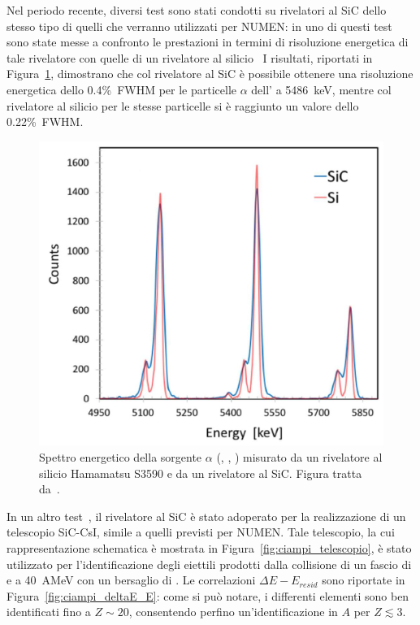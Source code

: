 Nel periodo recente, diversi test sono stati condotti su rivelatori al SiC dello stesso tipo di quelli che verranno utilizzati per NUMEN: in uno di questi test sono state messe a confronto le prestazioni in termini di risoluzione energetica di tale rivelatore con quelle di un rivelatore al silicio~\cite{tudisco:sensors18}
I risultati, riportati in Figura~\ref{fig:tudisco_spettro}, dimostrano che col rivelatore al SiC è possibile ottenere una risoluzione energetica dello 0.4\%~FWHM per le particelle $\alpha$ dell' a 5486~keV, mentre col rivelatore al silicio per le stesse particelle si è raggiunto un valore dello 0.22\%~FWHM.
\begin{figure} [!p]
	\centering
	\includegraphics[width=\textwidth, keepaspectratio]{Grafici/spettro_sic_tagliato.png}
	\caption{Spettro energetico della sorgente $\alpha$ (, , ) misurato da un rivelatore al silicio Hamamatsu S3590 e da un rivelatore al SiC. Figura tratta da~\cite{tudisco:sensors18}.} \label{fig:tudisco_spettro}
\end{figure}
In un altro test~\cite{ciampi:nima19}, il rivelatore al SiC è stato adoperato per la realizzazione di un telescopio SiC-CsI, simile a quelli previsti per NUMEN.
Tale telescopio, la cui rappresentazione schematica è mostrata in Figura~\ref{fig:ciampi_telescopio}, è stato utilizzato per l'identificazione degli eiettili prodotti dalla collisione di un fascio di  e  a 40~AMeV con un bersaglio di . 
Le correlazioni $\Delta E - E_{resid}$ sono riportate in Figura~\ref{fig:ciampi_deltaE_E}: come si può notare, i differenti elementi sono ben identificati fino a $Z \sim 20$, consentendo perfino un'identificazione in $A$ per $Z \lesssim 3$.


